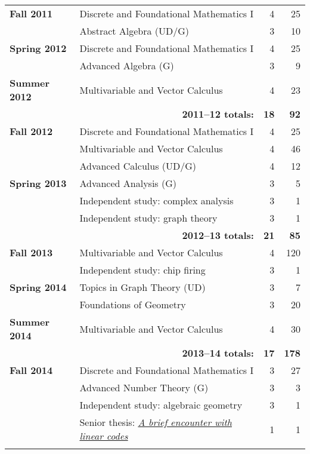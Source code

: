 \documentclass[12pt]{article}
\begin{document}
\begin{center}
\begin{longtable}{@{} l @{\hspace{1ex}} l @{} rr @{}}
\textbf{Fall 2011} & Discrete and Foundational Mathematics I & 4 & 25 \\
 & Abstract Algebra (UD/G) & 3 & 10 \\
\addlinespace[0.1in]

\textbf{Spring 2012} & Discrete and Foundational Mathematics I & 4 & 25 \\
 & Advanced Algebra (G) & 3 & 9 \\
\addlinespace[0.1in]

\textbf{Summer 2012} & Multivariable and Vector Calculus & 4 & 23 \\
 \cmidrule{2-4}
 & \multicolumn{1}{r}{\textbf{2011--12 totals:}} & \textbf{18} & \textbf{92} \\
 \cmidrule{2-4}

\textbf{Fall 2012} & Discrete and Foundational Mathematics I & 4 & 25 \\
 & Multivariable and Vector Calculus & 4 & 46 \\
 & Advanced Calculus (UD/G) & 4 & 12 \\
\addlinespace[0.1in]

\textbf{Spring 2013} & Advanced Analysis (G) & 3 & 5 \\
 & Independent study: complex analysis & 3 & 1 \\
 & Independent study: graph theory & 3 & 1 \\
 \cmidrule{2-4}
 & \multicolumn{1}{r}{\textbf{2012--13 totals:}} & \textbf{21} & \textbf{85} \\
 \cmidrule{2-4}

\textbf{Fall 2013} & Multivariable and Vector Calculus & 4 & 120 \\
  & Independent study: chip firing & 3 & 1 \\
\addlinespace[0.1in]

\textbf{Spring 2014} & Topics in Graph Theory (UD) & 3 & 7 \\
 & Foundations of Geometry & 3 & 20 \\
\addlinespace[0.1in]

\textbf{Summer 2014} & Multivariable and Vector Calculus & 4 & 30 \\
 \cmidrule{2-4}
 & \multicolumn{1}{r}{\textbf{2013--14 totals:}} & \textbf{17} & \textbf{178} \\
 \cmidrule{2-4}

\textbf{Fall 2014} & Discrete and Foundational Mathematics I & 3 & 27 \\
 & Advanced Number Theory (G) & 3 & 3 \\
 & Independent study: algebraic geometry & 3 & 1 \\
 & Senior thesis: \href{https://scholarworks.boisestate.edu/math_undergraduate_theses/3/}{\emph{A brief encounter with linear codes}} & 1 & 1 \\
\addlinespace[0.1in]


\end{longtable}
\end{center}
\end{document}
